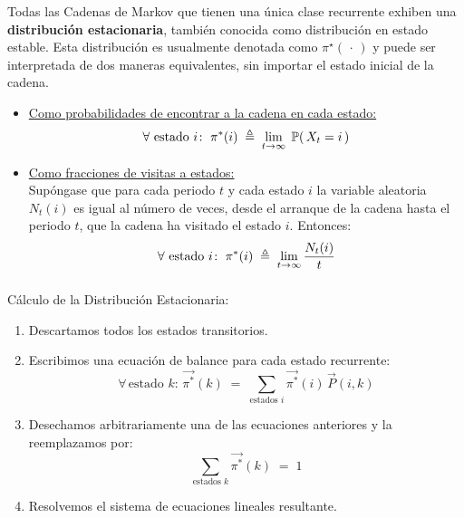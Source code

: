 \documentclass[ 10pt, xcolor = dvipsnames]{beamer}
\begin{document}
\begin{frame}[allowframebreaks]
\frametitle{\insertsubsection}

Todas las Cadenas de Markov que tienen una \'unica clase recurrente exhiben una \textbf{distribuci\'on estacionaria}, tambi\'en conocida como distribuci\'on en estado estable. Esta distribuci\'on es usualmente denotada como $\pi^\star( \, \cdot \, )$ y puede ser interpretada de dos maneras equivalentes, sin importar el estado inicial de la cadena. 
\begin{itemize}
\item \underline{Como probabilidades de encontrar a la cadena en cada estado:}
\[
\forall \text{ estado } i \colon \;
\pi^*(i) \; \triangleq \; \lim_{ t \rightarrow \infty } \;
\mathbb{P} ( \, X_t = i \, )
\]
\item \underline{Como fracciones de visitas a estados:} \\[0.5ex] Sup\'ongase que para cada periodo $t$ y cada estado $i$ la variable aleatoria \linebreak $N_t(i)$ es igual al n\'umero de veces, desde el arranque de la cadena hasta el periodo $t$, que la cadena ha visitado el estado $i$. Entonces: 
\[
\forall \text{ estado } i \colon \;
\pi^*(i) \; \triangleq \; \lim_{ t \rightarrow \infty } \frac{N_t(i)}{t}
\]
\end{itemize}

\end{frame}

\begin{frame}[allowframebreaks]
\frametitle{\insertsubsection}

C\'alculo de la Distribuci\'on Estacionaria: 
\begin{enumerate}
\item Descartamos todos los estados transitorios. 
\item Escribimos una ecuaci\'on de balance para cada estado recurrente: 
\[
\forall \, \text{estado } k \colon \, \vec{\pi^*}(k) \; = \; 
\sum_{\text{estados }i} \vec{\pi^*}(i) \, \vec{P}(i,k) 
\]
\item Desechamos arbitrariamente una de las ecuaciones anteriores y la reemplazamos por: 
\[
\sum_{\text{estados } k} \vec{\pi^*}(k) \; = \; 1
\]
\item Resolvemos el sistema de ecuaciones lineales resultante. 
\end{enumerate}

\end{frame}
\end{document}
